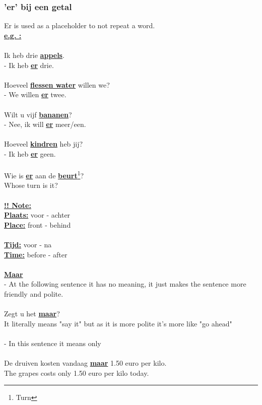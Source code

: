\documentclass[a4paper,14pt]{extarticle}
\newcommand{\note}[2]{\underline{\textbf{#1}}\footnote{#2}}
\newcommand{\attention}[1]{\underline{\textbf{!! #1}}}
\newcommand{\emp}[1]{\underline{\textbf{#1}}}
\begin{document}
\begin{paracol}{2}
\subsubsection{'er' bij een getal}
Er is used as a placeholder to not repeat a word. \\
\emp{e.g. : } \\ \\
Ik heb drie \emp{appels}. \\
- Ik heb \emp{er} drie. \\ \\
Hoeveel \emp{flessen water} willen we? \\
- We willen \emp{er} twee. \\ \\ 
Wilt u vijf \emp{bananen}? \\ 
- Nee, ik will \emp{er} meer/een. \\ \\
Hoeveel \emp{kindren} heb jij? \\
- Ik heb \emp{er} geen. \\ \\
Wie is \emp{er} aan de \note{beurt}{Turn}? \\
Whose turn is it? \\
\switchcolumn
\hfill \\
\attention{Note:} \\
\emp{Plaats:} voor - achter \\
\emp{Place:} front - behind \\ \\
\emp{Tijd:} voor - na \\
\emp{Time:} before - after \\ \\
\emp{Maar} \\
- At the following sentence it has no meaning, it just makes the sentence more friendly and polite. \\ \\
Zegt u het \emp{maar}? \\
It literally means "say it" but as it is more polite it's more like "go ahead" \\ \\
- In this sentence it means only \\ \\
De druiven kosten vandaag \emp{maar} 1.50 euro per kilo. \\
The grapes costs only 1.50 euro per kilo today. \\
\end{paracol}
\end{document}
